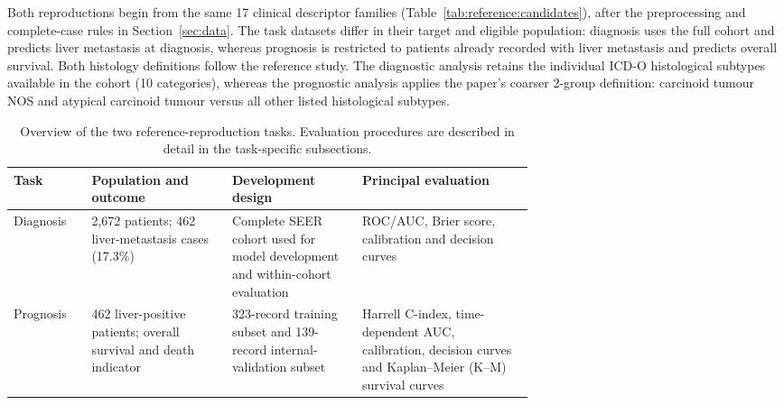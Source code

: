 Both reproductions begin from the same 17 clinical descriptor families
(Table~\ref{tab:reference:candidates}), after the preprocessing and complete-case
rules in Section~\ref{sec:data}. The task datasets differ in their target and
eligible population: diagnosis uses the full cohort and predicts liver metastasis
at diagnosis, whereas prognosis is restricted to patients already recorded with
liver metastasis and predicts overall survival. Both histology definitions follow
the reference study. The diagnostic analysis retains the individual ICD-O
histological subtypes available in the cohort (10 categories), whereas the
prognostic analysis applies the paper's coarser 2-group definition: carcinoid
tumour NOS and atypical carcinoid tumour versus all other listed histological
subtypes.

\begin{table}[htbp]
\centering\small
\caption{Overview of the two reference-reproduction tasks. Evaluation procedures
are described in detail in the task-specific subsections.}
\label{tab:reference:task_overview}
\begin{tabularx}{\linewidth}{@{}p{0.15\linewidth}p{0.27\linewidth}p{0.25\linewidth}Y@{}}
\toprule
Task & Population and outcome & Development design & Principal evaluation \\
\midrule
Diagnosis & 2,672 patients; 462 liver-metastasis cases (17.3\%) & Complete SEER
cohort used for model development and within-cohort evaluation & ROC/AUC, Brier score, calibration and
decision curves \\
Prognosis & 462 liver-positive patients; overall survival and death indicator &
323-record training subset and 139-record internal-validation subset & Harrell
C-index, time-dependent AUC, calibration, decision curves and Kaplan--Meier
(K--M) survival curves \\
\bottomrule
\end{tabularx}
\end{table}
\FloatBarrier

